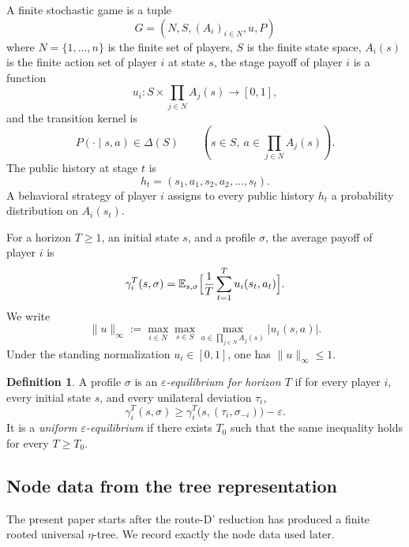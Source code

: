 \documentclass[12pt]{article}
\theoremstyle{definition}
\newtheorem{definition}[theorem]{Definition}
\newcommand{\eps}{\varepsilon}
\newcommand{\E}{\mathbb{E}}
\newcommand{\1}{\mathbf{1}}
\begin{document}
A finite stochastic game is a tuple
\[
G=(N,S,(A_i)_{i\in N},u,P)
\]
where $N=\{1,\dots,n\}$ is the finite set of players, $S$ is the finite state
space, $A_i(s)$ is the finite action set of player $i$ at state $s$, the stage
payoff of player $i$ is a function
\[
u_i:S\times \prod_{j\in N}A_j(s)\to [0,1],
\]
and the transition kernel is
\[
P(\cdot\mid s,a)\in \Delta(S)
\qquad (s\in S,\ a\in \prod_{j\in N}A_j(s)).
\]
The public history at stage $t$ is
\[
h_t=(s_1,a_1,s_2,a_2,\dots,s_t).
\]
A behavioral strategy of player $i$ assigns to every public history $h_t$ a
probability distribution on $A_i(s_t)$.

For a horizon $T\ge 1$, an initial state $s$, and a profile $\sigma$, the average
payoff of player $i$ is
\[
\gamma_i^T(s,\sigma)
=
\E_{s,\sigma}\Bigl[\frac1T\sum_{t=1}^T u_i(s_t,a_t)\Bigr].
\]
We write
\[
\|u\|_\infty
:=
\max_{i\in N}\max_{s\in S}\max_{a\in\prod_{j\in N}A_j(s)} |u_i(s,a)|.
\]
Under the standing normalization $u_i\in[0,1]$, one has $\|u\|_\infty\le 1$.

\begin{definition}
A profile $\sigma$ is an \emph{$\eps$-equilibrium for horizon $T$} if for every
player $i$, every initial state $s$, and every unilateral deviation $\tau_i$,
\[
\gamma_i^T(s,\sigma)
\ge
\gamma_i^T\bigl(s,(\tau_i,\sigma_{-i})\bigr)-\eps.
\]
It is a \emph{uniform $\eps$-equilibrium} if there exists $T_0$ such that the same
inequality holds for every $T\ge T_0$.
\end{definition}

\subsection{Node data from the tree representation}

The present paper starts after the route-D' reduction has produced a finite rooted
universal $\eta$-tree. We record exactly the node data used later.
\end{document}
